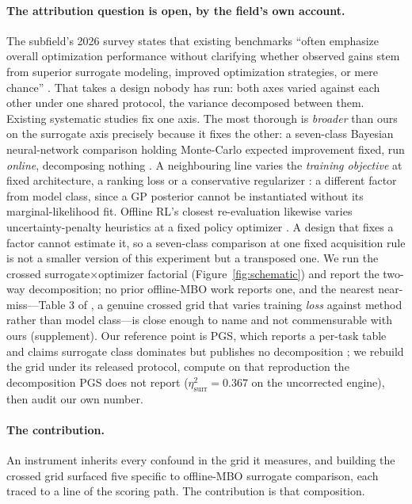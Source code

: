 \documentclass[letterpaper]{article} %
\theoremstyle{plain}
\newcommand{\mdemph}[1]{\emph{#1}}
\begin{document}
\paragraph{The attribution question is open, by the field's own account.} The subfield's 2026 survey states that existing benchmarks ``often emphasize overall optimization performance without clarifying whether observed gains stem from superior surrogate modeling, improved optimization strategies, or mere chance'' \citep{kim2025mbosurvey}. That takes a design nobody has run: both axes varied against each other under one shared protocol, the variance decomposed between them. Existing systematic studies fix one axis. The most thorough is \mdemph{broader} than ours on the surrogate axis precisely because it fixes the other: a seven-class Bayesian neural-network comparison holding Monte-Carlo expected improvement fixed, run \mdemph{online}, decomposing nothing \citep{li2024bnnsurrogates}. A neighbouring line varies the \mdemph{training objective} at fixed architecture, a ranking loss \citep{tan2025ltr} or a conservative regularizer \citep{trabucco2021coms}: a different factor from model class, since a GP posterior cannot be instantiated without its marginal-likelihood fit. Offline RL's closest re-evaluation likewise varies uncertainty-penalty heuristics at a fixed policy optimizer \citep{lu2022revisiting}. A design that fixes a factor cannot estimate it, so a seven-class comparison at one fixed acquisition rule is not a smaller version of this experiment but a transposed one. We run the crossed surrogate$\times$optimizer factorial (Figure~\ref{fig:schematic}) and report the two-way decomposition; no prior offline-MBO work reports one, and the nearest near-miss---Table 3 of \citet{tan2025ltr}, a genuine crossed grid that varies training \mdemph{loss} against method rather than model class---is close enough to name and not commensurable with ours (supplement). Our reference point is PGS, which reports a per-task table and claims surrogate class dominates but publishes no decomposition \citep{chemingui2024pggs}; we rebuild the grid under its released protocol, compute on that reproduction the decomposition PGS does not report ($\eta^2_{\text{surr}}{=}0.367$ on the uncorrected engine), then audit our own number.

\paragraph{The contribution.} An instrument inherits every confound in the grid it measures, and building the crossed grid surfaced five specific to offline-MBO surrogate comparison, each traced to a line of the scoring path. The contribution is that composition.
\end{document}
